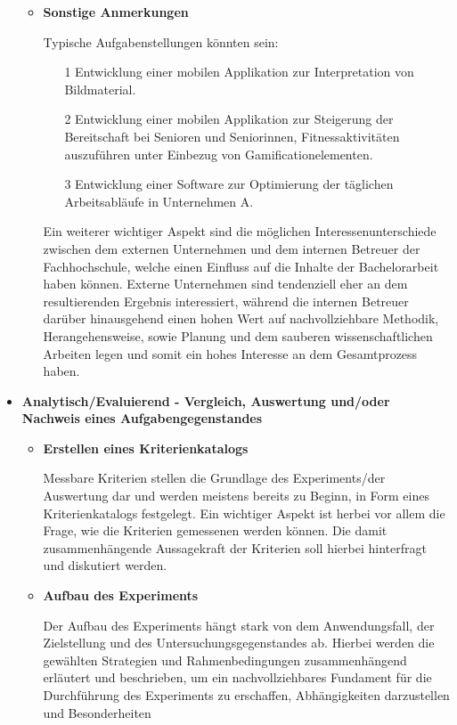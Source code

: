 \documentclass{scrreprt}
\begin{document}
\begin{itemize}
\begin{itemize}
	\item \textbf{Sonstige Anmerkungen}
	\par Typische Aufgabenstellungen könnten sein:
	\begin{itemize}
		\item[1] Entwicklung einer mobilen Applikation zur Interpretation von Bildmaterial.
		\item[2] Entwicklung einer mobilen Applikation zur Steigerung der Bereitschaft bei 
		Senioren und Seniorinnen, Fitnessaktivitäten auszuführen unter Einbezug von 
		Gamificationelementen.
		\item[3] Entwicklung einer Software zur Optimierung der täglichen Arbeitsabläufe in 
		Unternehmen A.
	\end{itemize}
	
	\par Ein weiterer wichtiger Aspekt sind die möglichen Interessenunterschiede zwischen dem 
	externen Unternehmen und dem internen Betreuer der Fachhochschule, welche einen 
	Einfluss auf die Inhalte der Bachelorarbeit haben können. Externe Unternehmen sind 
	tendenziell eher an dem resultierenden Ergebnis interessiert, während die internen Betreuer 
	darüber hinausgehend einen hohen Wert auf nachvollziehbare Methodik, Herangehensweise, 
	sowie Planung und dem sauberen wissenschaftlichen Arbeiten legen und somit ein  hohes 
	Interesse an dem Gesamtprozess haben.
	\end{itemize}
\item \textbf{Analytisch/Evaluierend - Vergleich, Auswertung und/oder Nachweis eines Aufgabengegenstandes}
	\begin{itemize}
	\item \textbf{Erstellen eines Kriterienkatalogs}
	\par Messbare Kriterien stellen die Grundlage des Experiments/der Auswertung dar und werden 
	meistens bereits zu Beginn, in Form eines Kriterienkatalogs festgelegt. 
	Ein wichtiger Aspekt ist herbei vor allem die Frage, wie die Kriterien gemessenen werden 
	können. Die damit zusammenhängende Aussagekraft der Kriterien soll hierbei hinterfragt und 
	diskutiert werden.
	\item \textbf{Aufbau des Experiments}
	\par Der Aufbau des Experiments hängt stark von dem Anwendungsfall, der Zielstellung und des 
	Untersuchungsgegenstandes ab. Hierbei werden die gewählten Strategien und Rahmenbedingungen 
	zusammenhängend erläutert und beschrieben, um ein nachvollziehbares Fundament für die 
	Durchführung des Experiments zu erschaffen, Abhängigkeiten darzustellen und Besonderheiten 

\end{itemize}
\end{itemize}
\end{document}

